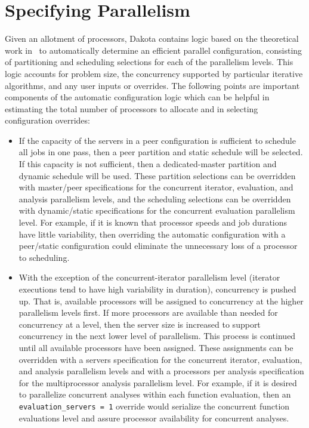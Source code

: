 \section{Specifying Parallelism}\label{parallel:spec}

Given an allotment of processors, Dakota contains logic based on the
theoretical work in~\cite{Eld00} to automatically determine an efficient
parallel configuration, consisting of partitioning and scheduling
selections for each of the parallelism levels. This logic accounts for
problem size, the concurrency supported by particular iterative
algorithms, and any user inputs or overrides. The following points are
important components of the automatic configuration logic which can be
helpful in estimating the total number of processors to allocate and
in selecting configuration overrides:

\begin{itemize}
\item If the capacity of the servers in a peer configuration is
  sufficient to schedule all jobs in one pass, then a peer partition
  and static schedule will be selected. If this capacity is not
  sufficient, then a dedicated-master partition and dynamic schedule
  will be used. These partition selections can be overridden with
  master/peer specifications for the concurrent iterator, evaluation,
  and analysis parallelism levels, and the scheduling selections can
  be overridden with dynamic/static specifications for the concurrent
  evaluation parallelism level. For example, if it is known that
  processor speeds and job durations have little variability, then
  overriding the automatic configuration with a peer/static
  configuration could eliminate the unnecessary loss of a processor to
  scheduling.

\item With the exception of the concurrent-iterator parallelism level
  (iterator executions tend to have high variability in duration),
  concurrency is pushed up. That is, available processors will be
  assigned to concurrency at the higher parallelism levels first. If
  more processors are available than needed for concurrency at a
  level, then the server size is increased to support concurrency in
  the next lower level of parallelism. This process is continued until
  all available processors have been assigned. These assignments can
  be overridden with a servers specification for the concurrent
  iterator, evaluation, and analysis parallelism levels and with a
  processors per analysis specification for the multiprocessor
  analysis parallelism level. For example, if it is desired to
  parallelize concurrent analyses within each function evaluation,
  then an \texttt{evaluation\_servers = 1} override would serialize
  the concurrent function evaluations level and assure processor
  availability for concurrent analyses.
\end{itemize}

